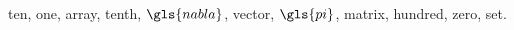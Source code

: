 \documentclass{article}
\begin{document}
\gls{ten}, \gls{one}, \gls{array}, \gls{tenth}, $\gls{nabla}$,
\gls{vector}, $\gls{pi}$, \gls{matrix}, \gls{hundred}, \gls{zero},
\gls{set}.

\printunsrtglossaries
\end{document}
